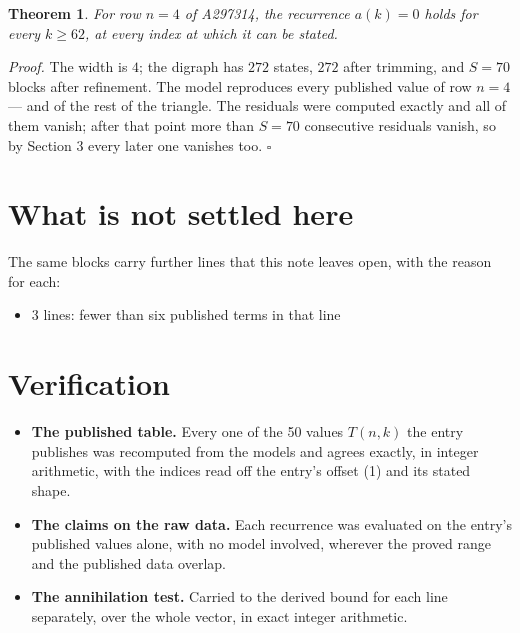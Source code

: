 \documentclass[11pt]{article}
\newtheorem{theorem}{Theorem}
\theoremstyle{definition}
\begin{document}
\begin{theorem} For row $n = 4$ of A297314, the recurrence $a(k) = 0$ holds for every $k \ge 62$, at every index at which it can be stated.\end{theorem}

{\itshape Proof.} The width is $4$; the digraph has $272$ states, $272$ after trimming, and $S = 70$ blocks after refinement. The model reproduces every published value of row $n = 4$ --- and of the rest of the triangle. The residuals were computed exactly and all of them vanish; after that point more than $S = 70$ consecutive residuals vanish, so by Section 3 every later one vanishes too. $\square$

\section{What is not settled here}

The same blocks carry further lines that this note leaves open, with the reason for each:

\begin{itemize}

\item 3 lines: fewer than six published terms in that line

\end{itemize}

\section{Verification}

\begin{itemize}

\item {\bfseries The published table.} Every one of the 50 values $T(n,k)$ the entry publishes was recomputed from the models and agrees exactly, in integer arithmetic, with the indices read off the entry's offset (1) and its stated shape.

\item {\bfseries The claims on the raw data.} Each recurrence was evaluated on the entry's published values alone, with no model involved, wherever the proved range and the published data overlap.

\item {\bfseries The annihilation test.} Carried to the derived bound for each line separately, over the whole vector, in exact integer arithmetic.

\end{itemize}
\end{document}
